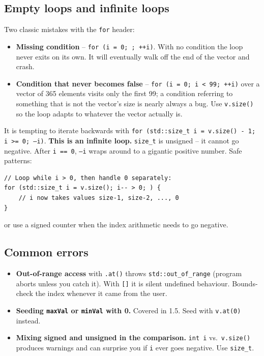 \documentclass[11pt]{article}
\begin{document}
\subsection{Empty loops and infinite loops}

Two classic mistakes with the \texttt{for} header:

\begin{itemize}
    \item \textbf{Missing condition} -- \texttt{for (i = 0; ; ++i)}.
          With no condition the loop never exits on its own. It will
          eventually walk off the end of the vector and crash.
    \item \textbf{Condition that never becomes false} --
          \texttt{for (i = 0; i < 99; ++i)} over a vector of 365
          elements visits only the first 99; a condition referring to
          something that is not the vector's size is nearly always a
          bug. Use \texttt{v.size()} so the loop adapts to whatever
          the vector actually is.
\end{itemize}

\begin{warnbox}
It is tempting to iterate backwards with
\texttt{for (std::size\_t i = v.size() - 1; i >= 0; --i)}. \textbf{This
is an infinite loop.} \texttt{size\_t} is unsigned -- it cannot go
negative. After \texttt{i == 0}, \texttt{--i} wraps around to a
gigantic positive number. Safe patterns:
\begin{lstlisting}
// Loop while i > 0, then handle 0 separately:
for (std::size_t i = v.size(); i-- > 0; ) {
    // i now takes values size-1, size-2, ..., 0
}
\end{lstlisting}
or use a signed counter when the index arithmetic needs to go
negative.
\end{warnbox}

\subsection{Common errors}

\begin{itemize}
    \item \textbf{Out-of-range access} with \texttt{.at()} throws
          \texttt{std::out\_of\_range} (program aborts unless you
          catch it). With \texttt{[]} it is silent undefined
          behaviour. Bounds-check the index whenever it came from the
          user.
    \item \textbf{Seeding \texttt{maxVal} or \texttt{minVal} with 0.}
          Covered in 1.5. Seed with \texttt{v.at(0)} instead.
    \item \textbf{Mixing signed and unsigned in the comparison.}
          \texttt{int i} vs.\ \texttt{v.size()} produces warnings and
          can surprise you if \texttt{i} ever goes negative. Use
          \texttt{size\_t}.
\end{itemize}
\end{document}
